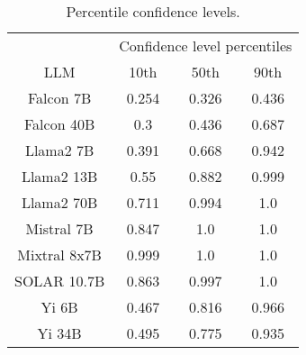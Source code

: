 \begin{table*}
\centering
\begin{tabular}{c|c|c|c}
& \multicolumn{3}{c}{Confidence level percentiles} \\ 
LLM & 10th & 50th & 90th\\ \hline
Falcon 7B & 0.254 & 0.326 & 0.436\\
Falcon 40B & 0.3 & 0.436 & 0.687\\
Llama2 7B & 0.391 & 0.668 & 0.942\\
Llama2 13B & 0.55 & 0.882 & 0.999\\
Llama2 70B & 0.711 & 0.994 & 1.0\\
Mistral 7B & 0.847 & 1.0 & 1.0\\
Mixtral 8x7B & 0.999 & 1.0 & 1.0\\
SOLAR 10.7B & 0.863 & 0.997 & 1.0\\
Yi 6B & 0.467 & 0.816 & 0.966\\
Yi 34B & 0.495 & 0.775 & 0.935\\
\hline
\end{tabular}
\caption{Percentile confidence levels.}
\label{tab:percentile_conf}
\end{table*}
